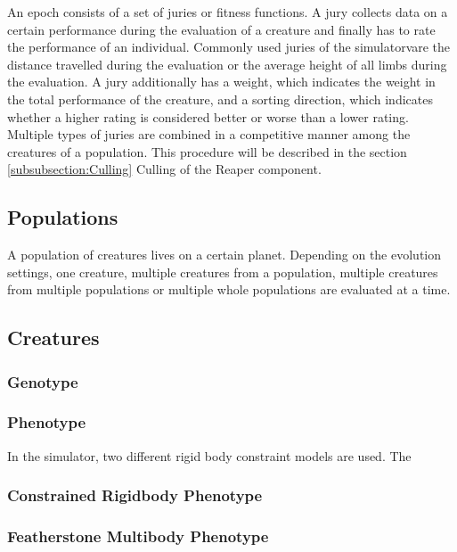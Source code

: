\documentclass[main]{subfiles}
\begin{document}
An epoch consists of a set of juries or fitness functions. A jury collects data on a certain performance during the evaluation of a creature and finally has to rate the performance of an individual. Commonly used juries of the simulatorvare the distance travelled during the evaluation or the average height of all limbs during the evaluation. A jury additionally has a weight, which indicates the weight in the total performance of the creature, and a sorting direction, which indicates whether a higher rating is considered better or worse than a lower rating. Multiple types of juries are combined in a competitive manner among the creatures of a population. This procedure will be described in the section \ref{subsubsection:Culling} Culling of the Reaper component.

\subsection{Populations}

A population of creatures lives on a certain planet. Depending on the evolution settings, one creature, multiple creatures from a population, multiple creatures from multiple populations or multiple whole populations are evaluated at a time.

\subsection{Creatures}

\lipsum[7]

\subsubsection{Genotype}

\lipsum[8]

\subsubsection{Phenotype}

\lipsum[9]
In the simulator, two different rigid body constraint models are used. The 

\subsubsection{Constrained Rigidbody Phenotype}

\lipsum[10]

\subsubsection{Featherstone Multibody Phenotype}
\end{document}
